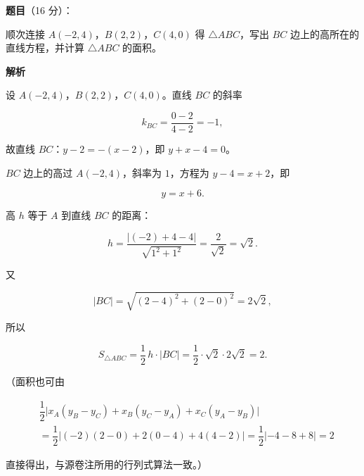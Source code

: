 \begin{answer}

\textbf{题目}（16 分）：

顺次连接 $A(-2,4)$，$B(2,2)$，$C(4,0)$ 得 $\triangle ABC$，写出 $BC$ 边上的高所在的直线方程，并计算 $\triangle ABC$ 的面积。

\textbf{解析}

设 $A(-2,4)$，$B(2,2)$，$C(4,0)$。直线 $BC$ 的斜率

\nopagebreak[4]
\[
k_{BC}=\frac{0-2}{4-2}=-1,
\]

故直线 $BC$：$y-2=-(x-2)$，即 $y+x-4=0$。

$BC$ 边上的高过 $A(-2,4)$，斜率为 $1$，方程为 $y-4=x+2$，即

\nopagebreak[4]
\[
y=x+6.
\]

高 $h$ 等于 $A$ 到直线 $BC$ 的距离：

\nopagebreak[4]
\[
h=\frac{|(-2)+4-4|}{\sqrt{1^2+1^2}}=\frac2{\sqrt2}=\sqrt2.
\]

又

\nopagebreak[4]
\[
|BC|=\sqrt{(2-4)^2+(2-0)^2}=2\sqrt2,
\]

所以

\nopagebreak[4]
\[
S_{\triangle ABC}=\frac12\,h\cdot|BC|=\frac12\cdot\sqrt2\cdot2\sqrt2=2.
\]

（面积也可由

\nopagebreak[4]
\[
\begin{aligned}
&\dfrac12\bigl|x_A(y_B-y_C)+x_B(y_C-y_A)+x_C(y_A-y_B)\bigr|\\
&=\dfrac12\bigl|(-2)(2-0)+2(0-4)+4(4-2)\bigr|
=\dfrac12|{-4-8+8}|=2
\end{aligned}
\]

直接得出，与源卷注所用的行列式算法一致。）


\end{answer}
